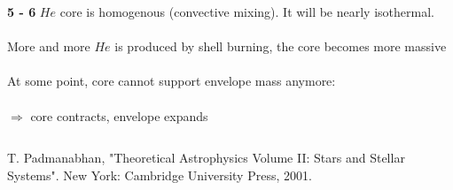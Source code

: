 




\begin{frame}
	\begin{columns}
		\begin{block}{\textbf{5 - 6 }}
			$He$ core is homogenous (convective mixing). It will be nearly isothermal.\\~\\
			
			More and more $He$ is produced by shell burning, the core becomes more massive \\~\\			
			
			At some point, core cannot support envelope mass anymore: \\~\\
			
			
			$\Rightarrow$ core contracts, envelope expands
		\end{block}
		\vspace{.77cm}
	\end{columns}	
	\begin{center}
		\fillframe
		\setlength{\baselineskip}{0pt}
		{\tiny
			T. Padmanabhan, "Theoretical Astrophysics Volume II: Stars and Stellar Systems". New York: Cambridge University Press, 2001.
		}
	\end{center}
\end{frame}





